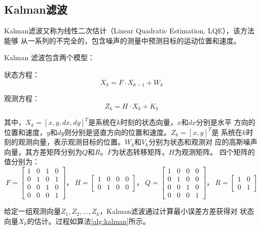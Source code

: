 \subsection{Kalman滤波}
\label{sec:kalman}

Kalman滤波又称为线性二次估计（Linear Quadratic Estimation, LQE），该方法能够
从一系列的不完全的，包含噪声的测量中预测目标的运动位置和速度。

Kalman 滤波包含两个模型：

\begin{compactenum}
\item 状态方程：
  \begin{equation}
    \label{eq:state}
    X_{k}=F\cdot X_{k-1}+W_k
  \end{equation}
\item 观测方程：
  \begin{equation}
    \label{eq:observation}
    Z_{k}=H\cdot X_{k}+K_{k}
  \end{equation}
\end{compactenum}

其中，$X_k = [x,y,dx,dy]^{T}$是系统在$k$时刻的状态向量，$x$和$dx$分别是水平
方向的位置和速度，$y$和$dy$则分别是竖直方向的位置和速度。$Z_k=[x,y]^{T}$是
系统在$k$时刻的观测向量，表示观测目标的位置。$W_k$和$V_k$分别为状态和观测对
应的高斯噪声向量，其方差矩阵分别为$Q$和$R$。$F$为状态转移矩阵，$H$为观测矩阵。
四个矩阵的值分别为：$$F=\begin{bmatrix}
  1 & 0 & 1 & 0\\0 & 1 & 0 & 1 \\ 0 & 0 & 1 & 0\\ 0 & 0 & 0 & 1
\end{bmatrix}
\mbox{，}~
H = \begin{bmatrix}
  1 & 0 & 0 & 0\\0 & 1 & 0 & 0
\end{bmatrix}
\mbox{，}~
Q=\begin{bmatrix}
  1 & 0 & 0 & 0\\0 & 1 & 0 & 0 \\ 0 & 0 & 1 & 0\\ 0 & 0 & 0 & 1
\end{bmatrix}
\mbox{，}~
R = \begin{bmatrix}
  1 & 0 \\0 & 1 
\end{bmatrix}
$$

给定一组观测向量$Z_1, Z_2, \ldots, Z_k$，Kalman滤波通过计算最小误差方差获得对
状态向量$X_k$的估计。过程如算法\ref{alg:kalman}所示。


